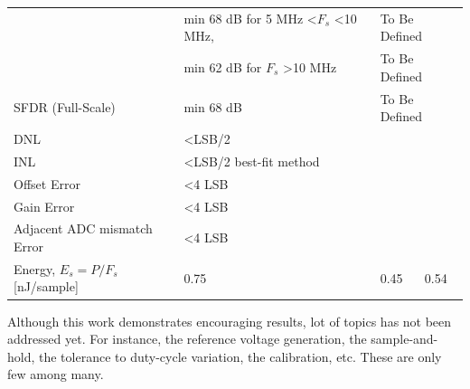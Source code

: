 \begin{table}[htp]
\begin{tabular}{llll}
		\rowcolor{white}                      & min 68 dB for 5 MHz \textless $F_s$  \textless 10 MHz, & \multicolumn{2}{1}{To Be Defined}\\
		\rowcolor{white}						& min 62 dB for $F_s$  \textgreater 10 MHz & \multicolumn{2}{1}{To Be Defined} \\
		SFDR (Full-Scale)                & min 68 dB & \multicolumn{2}{1}{To Be Defined}                                                                                             \\
		DNL                              & \textless LSB/2 & &                                                                                      \\
		INL                              & \textless LSB/2 best-fit method & &                                                                                  \\
		Offset Error                     & \textless 4 LSB   & &                                                                                                                                           \\
		Gain Error                       & \textless 4 LSB   & &                                                                                                                                         \\
		Adjacent ADC mismatch Error      & \textless 4 LSB   & &                                                                                                                                          \\
		Energy, $E_s = P/F_s$ [nJ/sample] & 0.75  & 0.45 & 0.54   \\ \bottomrule
	\end{tabular}
\end{table}

Although this work demonstrates encouraging results, lot of topics has not been addressed yet. For instance, the reference voltage generation, the sample-and-hold, the tolerance to duty-cycle variation, the calibration, etc. These are only few among many.